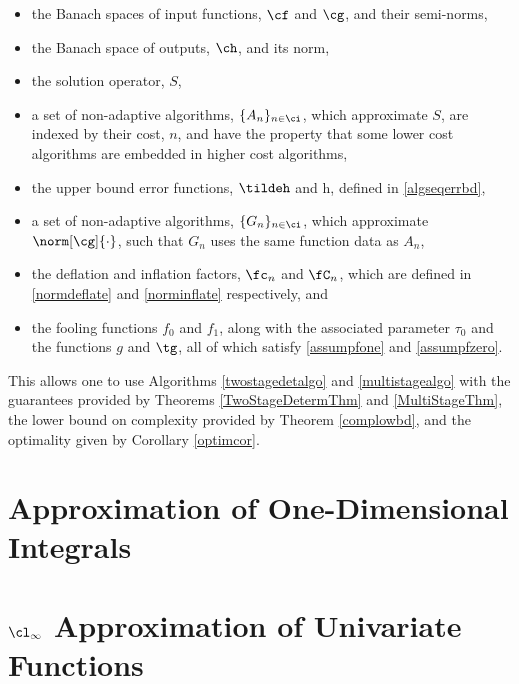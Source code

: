 \documentclass[]{elsarticle}
\theoremstyle{definition}
\theoremstyle{remark}
\begin{document}
\begin{itemize}

\item the Banach spaces of input functions, $\cf$ and $\cg$, and their semi-norms, 

\item the Banach space of outputs, $\ch$, and its norm,

\item the solution operator, $S$,

\item a set of non-adaptive algorithms, $\{A_n\}_{n \in \ci}$, which approximate $S$, are indexed by their cost, $n$, and have the property that some lower cost algorithms are embedded in higher cost algorithms,

\item the upper bound error functions, $\tildeh$ and h, defined in \eqref{algseqerrbd}, 

\item a set of non-adaptive algorithms, $\{G_n\}_{n \in \ci}$, which approximate $\norm[\cg]{\cdot}$, such that $G_n$ uses the same function data as $A_n$,

\item the deflation and inflation factors, $\fc_n$ and $\fC_n$, which are defined in \eqref{normdeflate} and \eqref{norminflate} respectively, and

\item the fooling functions $f_0$ and $f_1$, along with the associated parameter $\tau_0$ and the functions $g$ and $\tg$, all of which satisfy \eqref{assumpfone} and \eqref{assumpfzero}.

\end{itemize}
This allows one to use Algorithms \ref{twostagedetalgo} and \ref{multistagealgo} with the guarantees provided by Theorems \ref{TwoStageDetermThm} and \ref{MultiStageThm}, the lower bound on complexity provided by Theorem \ref{complowbd}, and the optimality given by Corollary \ref{optimcor}.


\section{Approximation of One-Dimensional Integrals} \label{integsec}



\section{$\cl_{\infty}$ Approximation of Univariate Functions} \label{approxsec}
\end{document}
